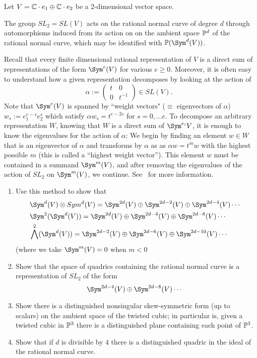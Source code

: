 \begin{exercise}\label{rnc and representations}
Let $V = \CC\cdot e_1\oplus \CC\cdot e_2$ be a 2-dimensional vector space. 

The group $SL_2= SL(V)$ acts on the rational normal curve of degree $d$ through automorphisms induced from its action on
 on the ambient space $\PP^d$ of the rational normal curve, which may be identified with $\PP(\Sym^d(V))$.

Recall that every finite dimensional rational 
representation of $V$ is a direct sum of representations of the form $\Sym^e(V)$ for various $e\geq 0$. Moreover, it is often easy to understand
how a given representation decomposes by looking at the action of
$$
\alpha := \begin{pmatrix}
t&0\\
0&t^{-1}
\end{pmatrix}
\in SL(V).
$$
Note that $\Sym^e(V)$ is spanned by ``weight vectors" ($\equiv$ eigenvectors of $\alpha$) $w_s := e_1^{e-s} e_2^{s}$ 
which satisfy $\alpha w_s = t^{e-2s}$ for $s = 0, \dots e$.
To decompose an arbitrary representation $W$, knowing that $W$ is a direct sum of $\Sym^{e_i}V$, it is enough to know the 
eigenvalues for the action of $\alpha$: We begin by finding an element $w\in W$ that
is an eigenvector of $\alpha$ and transforms by $\alpha$ as
as $\alpha w = t^mw$ with the highest possible $m$ (this is called a ``highest weight vector''). This element $w$ must be contained
in a summand $\Sym^m(V)$, and after removing the eigenvalues of the action of $SL_2$ on $\Sym^m(V)$, we continue. See~\cite[Chapter ****]{Fulton-Harris}
for more information.
\begin{enumerate}
 \item Use this method to show that 
\begin{align*}
&\Sym^d(V)\otimes Sym^d(V)= \Sym^{2d}(V) \oplus  \Sym^{2d-2}(V) \oplus \Sym^{2d-4}(V) \cdots\\
 &\Sym^2(\Sym^d(V))= \Sym^{2d}(V) \oplus \Sym^{2d-4}(V)\oplus \Sym^{2d-8}(V) \cdots\\
 &\bigwedge^2(\Sym^d(V))= \Sym^{2d-2}(V) \oplus \Sym^{2d-6}(V)\oplus \Sym^{2d-10}(V) \cdots
\end{align*}
  (where we take $\Sym^{m}(V)=0$ when $m<0$
 \item Show that the space of quadrics containing the rational normal curve is a representation of $SL_2$ of the form
 $$
 \Sym^{2d-4}(V)\oplus \Sym^{2d-8}(V) \cdots
 $$
  \item Show  there is a distinguished nonsingular skew-symmetric form (up to scalars) on the ambient space of the twisted cubic; in particular
  is, given a twisted cubic in $\PP^3$ there is a distinguished plane containing each point of $\PP^3$.
 \item Show that if $d$ is divisible by 4 there is a distinguished quadric in the ideal of the rational normal curve.
\end{enumerate}
\end{exercise}


